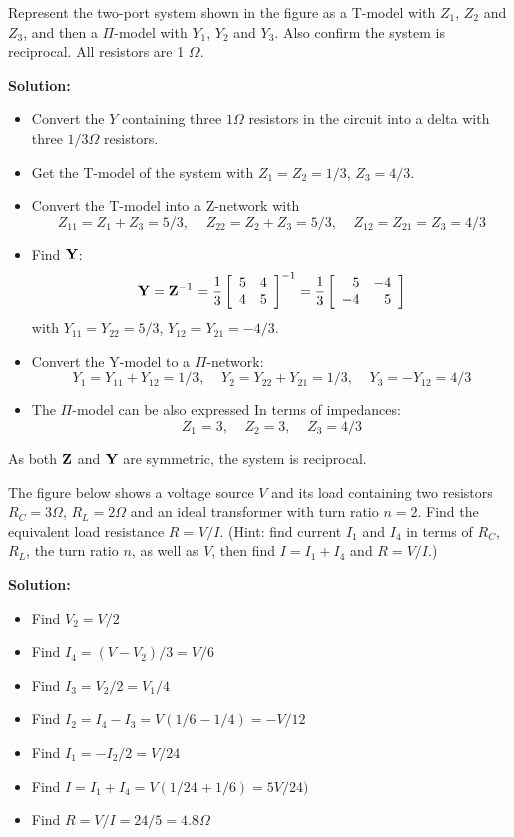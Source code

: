 \item Represent the two-port system shown in the figure as a T-model with
$Z_1$, $Z_2$ and $Z_3$, and then a $\Pi$-model with $Y_1$, $Y_2$ and 
$Y_3$. Also confirm the system is reciprocal. All resistors are 1 $\Omega$.


 {\bf Solution:}
 \begin{itemize}
 \item Convert the $Y$ containing three $1\Omega$ resistors in the circuit 
 into a delta with three $1/3\Omega$ resistors.
 \item Get the T-model of the system with $Z_1=Z_2=1/3$, $Z_3=4/3$.
 \item Convert the T-model into a Z-network with
 \[ Z_{11}=Z_1+Z_3=5/3,\;\;\;\;Z_{22}=Z_2+Z_3=5/3,
 	\;\;\;\;Z_{12}=Z_{21}=Z_3=4/3 \]
 \item Find ${\bf Y}$:
 \[ {\bf Y}={\bf Z}^{-1}=\frac{1}{3}\left[ \begin{array}{rr}
 	5 & 4 \\ 4 & 5 \end{array} \right]^{-1}
 	=\frac{1}{3}\left[ \begin{array}{rr} 5 & -4 \\ -4 & 5 \end{array} \right]
 \]
 	with $Y_{11}=Y_{22}=5/3$, $Y_{12}=Y_{21}=-4/3$.
 \item Convert the Y-model to a $\Pi$-network:
 \[ Y_1=Y_{11}+Y_{12}=1/3,\;\;\;\;Y_2=Y_{22}+Y_{21}=1/3,\;\;\;\;Y_3=-Y_{12}=4/3 \]
 \item The $\Pi$-model can be also expressed In terms of impedances:
 \[ Z_1=3,\;\;\;\;Z_2=3,\;\;\;\;Z_3=4/3 \]
 \end{itemize}
 As both ${\bf Z}$ and ${\bf Y}$ are symmetric, the system is reciprocal.

\item The figure below shows a voltage source $V$ and its load containing
two resistors $R_C=3\Omega$, $R_L=2\Omega$ and an ideal transformer with 
turn ratio $n=2$. Find the equivalent load resistance $R=V/I$.
(Hint: find current $I_1$ and $I_4$ in terms of $R_C$, $R_L$, the turn 
ratio $n$, as well as $V$, then find $I=I_1+I_4$ and $R=V/I$.)


 {\bf Solution:}
 
 \begin{itemize}
 \item Find $V_2=V/2$
 \item Find $I_4=(V-V_2)/3=V/6$
 \item Find $I_3=V_2/2=V_1/4$
 \item Find $I_2=I_4-I_3=V(1/6-1/4)=-V/12$
 \item Find $I_1=-I_2/2=V/24$
 \item Find $I=I_1+I_4=V(1/24+1/6)=5V/24)$
 \item Find $R=V/I=24/5=4.8\Omega$
 \end{itemize}
